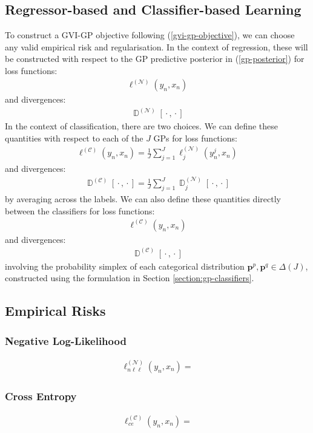 \documentclass{article}
\newcommand{\D}{\operatorname{\mathbb{D}}}
\newcommand{\wc}{\operatorname{{}\cdot{}}}
\numberwithin{equation}{section}
\begin{document}
\subsection{Regressor-based and Classifier-based Learning}
To construct a GVI-GP objective following (\ref{gvi-gp-objective}), we can choose any valid empirical risk and regularisation. In the context of regression, these will be constructed with respect to the GP predictive posterior in (\ref{gp-posterior}) for loss functions:
\begin{align}
    \ell^{(\mathcal{N})}(y_n, x_n)
\end{align}
and divergences:
\begin{align}
    \D^{(\mathcal{N})}[\wc, \wc]
\end{align}
In the context of classification, there are two choices. We can define these quantities with respect to each of the $J$ GPs for loss functions:
\begin{align}
    \ell^{(\mathcal{C})}(y_n, x_n) = \frac{1}{J}\sum_{j=1}^{J}\ell_j^{(\mathcal{N})}(y^j_n, x_n)
\end{align}
and divergences:
\begin{align}
    \D^{(\mathcal{C})}[\wc, \wc] = \frac{1}{J}\sum_{j=1}^{J}\D_j^{(\mathcal{N})}[\wc, \wc]
\end{align}
by averaging across the labels. We can also define these quantities directly between the classifiers for loss functions:
\begin{align}
    \ell^{(\mathcal{C})}(y_n, x_n)
\end{align}
and divergences:
\begin{align}
    \D^{(\mathcal{C})}[\wc, \wc]
\end{align}
involving the probability simplex of each categorical distribution $\mathbf{p}^p, \mathbf{p}^q \in \Delta(J)$, constructed using the formulation in Section \ref{section:gp-classifiers}. 

\subsection{Empirical Risks}
\subsubsection{Negative Log-Likelihood}
\begin{align}
    \ell_{n\ell\ell}^{(\mathcal{N})}(y_n, x_n) = 
\end{align}
\subsubsection{Cross Entropy}
\begin{align}
    \ell_{ce}^{(\mathcal{C})}(y_n, x_n) = 
\end{align}
\end{document}
